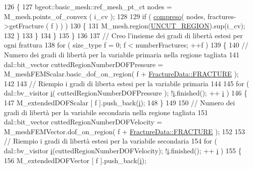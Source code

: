 \begin{DoxyCode}
126                 \{
127                     bgeot::basic\_mesh::ref\_mesh\_pt\_ct nodes = M\_mesh.points\_of\_convex ( i\_cv );
128 
129                     \textcolor{keywordflow}{if} ( \hyperlink{classMeshHandler_a3c8a354d214222155cb4eecf8214c938}{compreso}( nodes, fractures->getFracture ( f ) ) )
130                     \{
131                                 M\_mesh.region(\hyperlink{classMeshHandler_a239707613811024a58eece39a4c9bab3afc8bd5152d6d9b425b5e8bf4da8bd617}{UNCUT\_REGION}).sup(i\_cv);
132                     \}
133                 \}
134             \}
135         \}
136 
137         \textcolor{comment}{// Creo l'insieme dei gradi di libertà estesi per ogni frattura}
138         \textcolor{keywordflow}{for} ( size\_type f = 0; f < numberFractures; ++f )
139         \{
140             \textcolor{comment}{// Numero dei gradi di libertà per la variabile primaria nella regione tagliata}
141             dal::bit\_vector cuttedRegionNumberDOFPressure = M\_meshFEMScalar.basic\_dof\_on\_region( f + 
      \hyperlink{classFractureData_aaeea1f30482432d159eda9d98beb5e89a351538e4c78b34b5c0416e21903e1812}{FractureData::FRACTURE} );
142 
143             \textcolor{comment}{// Riempio i gradi di liberta estesi per la variabile primaria}
144             
145             \textcolor{keywordflow}{for} ( dal::bv\_visitor \hyperlink{matrici_8m_a6f6ccfcf58b31cb6412107d9d5281426}{i}( cuttedRegionNumberDOFPressure ); !\hyperlink{matrici_8m_a6f6ccfcf58b31cb6412107d9d5281426}{i}.finished(); ++
      \hyperlink{matrici_8m_a6f6ccfcf58b31cb6412107d9d5281426}{i} )
146             \{
147                 M\_extendedDOFScalar [ f ].push\_back(\hyperlink{matrici_8m_a6f6ccfcf58b31cb6412107d9d5281426}{i});
148             \}
149 
150             \textcolor{comment}{// Numero dei gradi di libertà per la variabile secondaria nella regione tagliata}
151             dal::bit\_vector cuttedRegionNumberDOFVelocity = M\_meshFEMVector.dof\_on\_region( f + 
      \hyperlink{classFractureData_aaeea1f30482432d159eda9d98beb5e89a351538e4c78b34b5c0416e21903e1812}{FractureData::FRACTURE} );
152 
153             \textcolor{comment}{// Riempio i gradi di libertà estesi per la variabile secondaria}
154             \textcolor{keywordflow}{for} ( dal::bv\_visitor \hyperlink{matrici_8m_a6f6ccfcf58b31cb6412107d9d5281426}{i}(cuttedRegionNumberDOFVelocity); !\hyperlink{matrici_8m_a6f6ccfcf58b31cb6412107d9d5281426}{i}.finished(); ++
      \hyperlink{matrici_8m_a6f6ccfcf58b31cb6412107d9d5281426}{i} )
155             \{
156                 M\_extendedDOFVector [ f ].push\_back(\hyperlink{matrici_8m_a6f6ccfcf58b31cb6412107d9d5281426}{i});

\end{DoxyCode}
